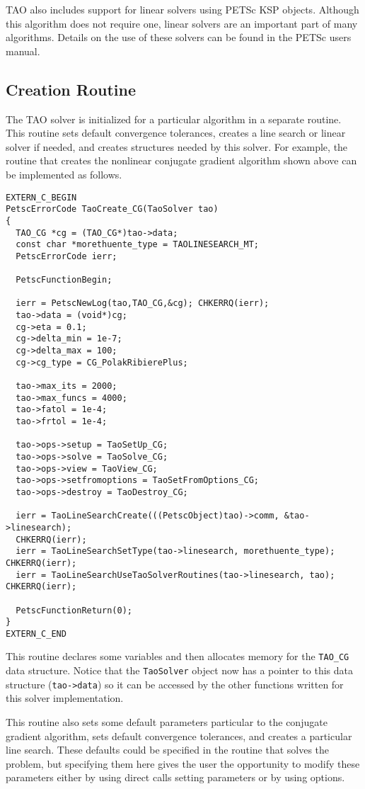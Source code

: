 TAO also includes support for linear solvers using PETSc KSP objects.  
Although this algorithm
does not require one, linear solvers are an important part of many
algorithms.  Details on the use of these solvers can be found in
the PETSc users manual.

\subsection{Creation Routine}
The TAO solver is initialized for a particular algorithm in a separate
routine.  This routine sets default convergence tolerances, creates a
line search or linear solver if needed, and creates structures needed
by this solver.   For example, the routine that creates the nonlinear
conjugate gradient algorithm shown above can be implemented as follows.

\begin{verbatim}
EXTERN_C_BEGIN
PetscErrorCode TaoCreate_CG(TaoSolver tao)
{
  TAO_CG *cg = (TAO_CG*)tao->data;
  const char *morethuente_type = TAOLINESEARCH_MT;
  PetscErrorCode ierr;

  PetscFunctionBegin;

  ierr = PetscNewLog(tao,TAO_CG,&cg); CHKERRQ(ierr);
  tao->data = (void*)cg;
  cg->eta = 0.1;
  cg->delta_min = 1e-7;
  cg->delta_max = 100;
  cg->cg_type = CG_PolakRibierePlus;

  tao->max_its = 2000;
  tao->max_funcs = 4000;
  tao->fatol = 1e-4;
  tao->frtol = 1e-4;

  tao->ops->setup = TaoSetUp_CG;
  tao->ops->solve = TaoSolve_CG;
  tao->ops->view = TaoView_CG;
  tao->ops->setfromoptions = TaoSetFromOptions_CG;
  tao->ops->destroy = TaoDestroy_CG;

  ierr = TaoLineSearchCreate(((PetscObject)tao)->comm, &tao->linesearch);
  CHKERRQ(ierr);
  ierr = TaoLineSearchSetType(tao->linesearch, morethuente_type); CHKERRQ(ierr);
  ierr = TaoLineSearchUseTaoSolverRoutines(tao->linesearch, tao); CHKERRQ(ierr);

  PetscFunctionReturn(0);
}
EXTERN_C_END
\end{verbatim}

\noindent This routine declares some variables and then allocates memory for the 
{\tt TAO\_CG} data structure. Notice that the \texttt{TaoSolver} object 
now has a pointer to this data structure (\texttt{tao->data}) so it can be 
accessed by the other functions written for this solver implementation.

This routine also sets some default parameters particular to the conjugate
gradient algorithm, sets default convergence tolerances, and creates
a particular line search.
These defaults could be specified in the routine that solves the problem,
but specifying them here gives the user the opportunity to modify these
parameters either by using direct calls setting parameters or by using options.

